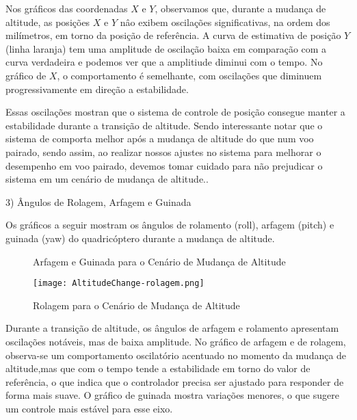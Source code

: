 Nos gráficos das coordenadas \(X\) e \(Y\), observamos que, durante a mudança de altitude, as posições \(X\) e \(Y\) nâo exibem oscilações significativas, na ordem dos milímetros, em torno da posição de referência. A curva de estimativa de posição \(Y\) (linha laranja) tem uma amplitude de oscilação baixa em comparação com a curva verdadeira e podemos ver que a amplitiude diminui com o tempo. No gráfico de \(X\), o comportamento é semelhante, com oscilações que diminuem progressivamente em direção a estabilidade.

Essas oscilações mostran que o sistema de controle de posição consegue manter a estabilidade durante a transição de altitude. Sendo interessante notar que o sistema de comporta melhor após a mudança de altitude do que num voo pairado, sendo assim, ao realizar nossos ajustes no sistema para melhorar o desempenho em voo pairado, devemos tomar cuidado para não prejudicar o sistema em um cenário de mudança de altitude..

3) Ângulos de Rolagem, Arfagem e Guinada

Os gráficos a seguir mostram os ângulos de rolamento (roll), arfagem (pitch) e guinada (yaw) do quadricóptero durante a mudança de altitude.

\begin{figure}[htbp]
    \centering
    \hfill
    \caption{Arfagem e Guinada para o Cenário de Mudança de Altitude}
    \label{fig:altitudechange-arfagem-guinada}
\end{figure}

\begin{figure}[H]
	\centering
	\texttt{[image: AltitudeChange-rolagem.png]}
	\caption{Rolagem para o Cenário de Mudança de Altitude}
	\label{fig:altitudechange-rolagem}
\end{figure}

Durante a transição de altitude, os ângulos de arfagem e rolamento apresentam oscilações notáveis, mas de baixa amplitude. No gráfico de arfagem e de rolagem, observa-se um comportamento oscilatório acentuado no momento da mudança de altitude,mas que com o tempo tende a estabilidade em torno do valor de referência, o que indica que o controlador precisa ser ajustado para responder de forma mais suave. O gráfico de guinada mostra variações menores, o que sugere um controle mais estável para esse eixo.

